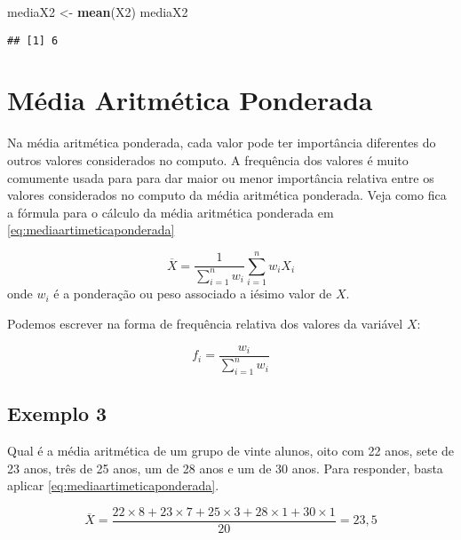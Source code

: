 \documentclass[
]{book}
\newenvironment{Shaded}{\begin{snugshade}}{\end{snugshade}}
\newcommand{\KeywordTok}[1]{\textcolor[rgb]{0.13,0.29,0.53}{\textbf{#1}}}
\newcommand{\NormalTok}[1]{#1}
\newcommand{\StringTok}[1]{\textcolor[rgb]{0.31,0.60,0.02}{#1}}
\begin{document}
\begin{Shaded}
\begin{Highlighting}[]
\NormalTok{mediaX2 <-}\StringTok{ }\KeywordTok{mean}\NormalTok{(X2)}
\NormalTok{mediaX2}
\end{Highlighting}
\end{Shaded}

\begin{verbatim}
## [1] 6
\end{verbatim}

\hypertarget{muxe9dia-aritmuxe9tica-ponderada}{%
\section{Média Aritmética Ponderada}\label{muxe9dia-aritmuxe9tica-ponderada}}

Na média aritmética ponderada, cada valor pode ter importância diferentes do outros valores considerados no computo. A frequência dos valores é muito comumente usada para para dar maior ou menor importância relativa entre os valores considerados no computo da média aritmética ponderada. Veja como fica a fórmula para o cálculo da média aritmética ponderada em \eqref{eq:mediaartimeticaponderada}

\begin{equation}
    \overline{X} = \frac{1}{\sum_{i=1}^{n}w_i} \sum_{i=1}^{n} w_i X_i
    \label{eq:mediaartimeticaponderada}
\end{equation}
onde \(w_i\) é a ponderação ou peso associado a iésimo valor de \(X\).

Podemos escrever na forma de frequência relativa dos valores da variável \(X\):

\begin{equation}
  f_i = \frac{w_i}{\sum_{i=1}^{n}w_i}
  \label{eq:eq13}
\end{equation}

\hypertarget{exemplo-3}{%
\subsection{Exemplo 3}\label{exemplo-3}}

Qual é a média aritmética de um grupo de vinte alunos, oito com 22 anos, sete
de 23 anos, três de 25 anos, um de 28 anos e um de 30 anos. Para responder,
basta aplicar \eqref{eq:mediaartimeticaponderada}.

\begin{equation*}
  \overline{X} = \frac{22\times 8 + 23\times 7 + 25 \times 3 + 28 \times 1 + 
  30 \times 1}{20} = 23,5
\end{equation*}
\end{document}

